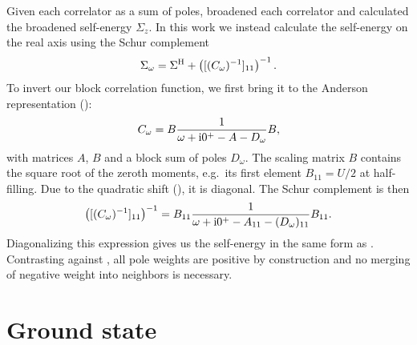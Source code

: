 Given each correlator as a sum of poles, \citeauthor{Kugler2022} \cite{Kugler2022} broadened
each correlator and calculated the broadened self-energy $\Sigma_z$.
In this work we instead calculate the self-energy on the real axis
using the Schur complement \cite{Schur1917}
\begin{equation}
    \Sigma_\omega = \Sigma^{\mathrm{H}} + \left([(C_\omega)^{-1}]_{11}\right)^{-1}.
\end{equation}
To invert our block correlation function, we first bring it to
the Anderson representation ():
\begin{equation}
    C_\omega = B\frac{1}{\omega + \mathrm{i}0^+ - A - D_\omega}B,
\end{equation}
with matrices $A$, $B$ and a block sum of poles $D_\omega$.
The scaling matrix $B$ contains the square root of the zeroth moments,
e.g.\ its first element $B_{11} = U/2$ at half-filling.
Due to the quadratic shift (), it is diagonal.
The Schur complement is then
\begin{equation}
    \left([(C_\omega)^{-1}]_{11}\right)^{-1}
    =
    B_{11} \frac{1}{\omega + \mathrm{i}0^+ - A_{11} - (D_\omega)_{11}} B_{11}.
\end{equation}
Diagonalizing this expression gives us the self-energy in the same form as
.
Contrasting against ,
all pole weights are positive by construction
and no merging of negative weight into neighbors is necessary.

\section{Ground state}

